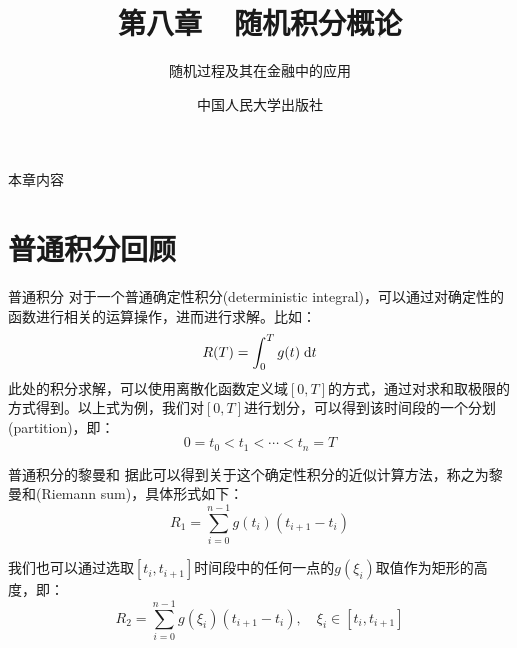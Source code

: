 \documentclass[t]{beamer}
\newcommand{\dif}{{\;\rm d}}
\begin{document}
\fontsize{11}{18}\selectfont


\CTEXindent



  \title{第八章~~随机积分概论}
\author{随机过程及其在金融中的应用}
\date{中国人民大学出版社}
  \begin{frame}
    \maketitle
  \end{frame}



\begin{frame}{本章内容}


    \tableofcontents


\end{frame}


\section{普通积分回顾}
\begin{frame}{普通积分}
对于一个普通确定性积分(deterministic integral)，可以通过对确定性的函数进行相关的运算操作，进而进行求解。比如：
\begin{equation*}
R(T)=\int^T_0 g(t)\dif t 
\end{equation*}
此处的积分求解，可以使用离散化函数定义域$[0,T]$的方式，通过对求和取极限的方式得到。以上式为例，我们对$[0,T]$进行划分，可以得到该时间段的一个分划(partition)，即：
\[0=t_0< t_1< \cdots< t_n=T \]
\end{frame}


\begin{frame}{普通积分的黎曼和}
据此可以得到关于这个确定性积分的近似计算方法，称之为黎曼和(Riemann sum)，具体形式如下：
\[R_1= \sum^{n-1}_{i=0}g(t_{i})(t_{i+1}-t_{i}) \]

我们也可以通过选取$[t_i,t_{i+1}]$时间段中的任何一点的$g(\xi_i)$取值作为矩形的高度，即：
\[R_2= \sum^{n-1}_{i=0}g\left(\xi_i\right)(t_{i+1}-t_{i}), \quad \xi_i\in[t_i,t_{i+1}]\]
\end{frame}
\end{document}
